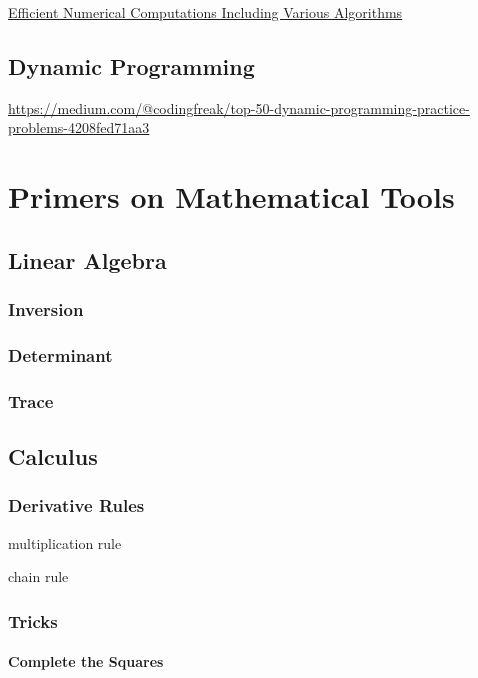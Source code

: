 \documentclass[]{article}
\begin{document}
\href{https://blog.thedataincubator.com/2015/01/a-cs-degree-for-data-science-part-i-efficient-numerical-computation/}{\color{blue}Efficient Numerical Computations Including Various Algorithms}

\chapter{Dynamic Programming}

\url{https://medium.com/@codingfreak/top-50-dynamic-programming-practice-problems-4208fed71aa3}

\part{Primers on Mathematical Tools}

\chapter{Linear Algebra}

\section{Inversion}

\section{Determinant}

\section{Trace}

\chapter{Calculus}

\section{Derivative Rules}

multiplication rule

chain rule

\section{Tricks}\subsection{Complete the Squares}
\end{document}
